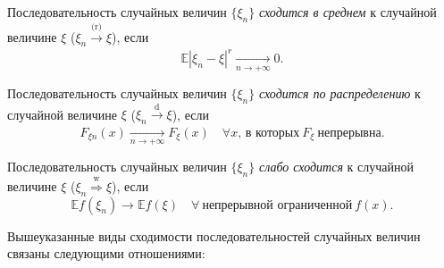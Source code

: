 \begin{defn}
    Последовательность случайных величин $\{\xi_n\}$ {\it сходится в среднем} к случайной величине $\xi$ ($\xi_n \xrightarrow[]{\text{(r)}} \xi$), если
    \begin{equation*}
        \mathbb{E}\left|\xi_{n}-\xi\right|^{r} \xrightarrow[n \to +\infty]{} 0.
    \end{equation*}
\end{defn}

\begin{defn}
    Последовательность случайных величин $\{\xi_n\}$ {\it сходится по распределению} к случайной величине $\xi$ ($\xi_n \xrightarrow[]{\text{d}} \xi$), если
    \begin{equation*}
        F_{\xi n}(x) \xrightarrow[n \to +\infty]{} F_{\xi}(x) \quad \forall x, \, \text{в которых}~ F_{\xi} ~\text{непрерывна}.
    \end{equation*}
\end{defn}

\begin{defn}
    Последовательность случайных величин $\{\xi_n\}$ {\it слабо сходится} к случайной величине $\xi$ ($\xi_n \stackrel{\text{w}}{\Rightarrow} \xi$), если
    \begin{equation*}
        \mathbb{E} f\left(\xi_{n}\right) \rightarrow \mathbb{E} f(\xi) \quad \forall~ \text{непрерывной ограниченной}~ f(x).
    \end{equation*}
\end{defn}
\begin{thm*}
    Вышеуказанные виды сходимости последовательностей случайных величин связаны следующими отношениями:
    
    {%
   }
\end{thm*}

